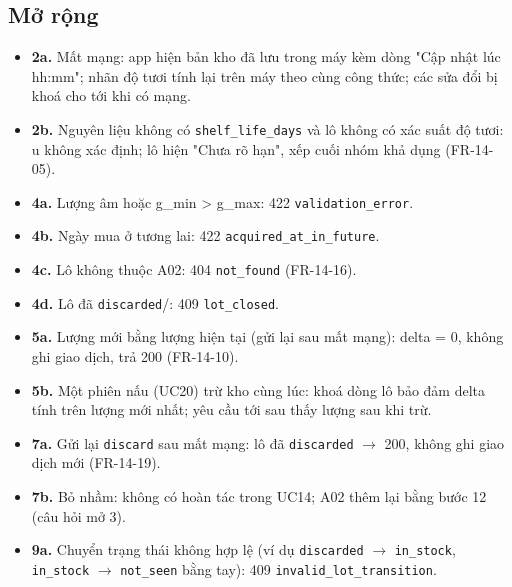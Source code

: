\subsection{Mở rộng}
\begin{itemize}
\item \textbf{2a.} Mất mạng: app hiện bản kho đã lưu trong máy kèm dòng "Cập nhật lúc hh:mm"; nhãn độ tươi tính lại trên máy theo cùng công thức; các sửa đổi bị khoá cho tới khi có mạng.
\item \textbf{2b.} Nguyên liệu không có {\small\texttt{shelf\_\allowbreak{}\allowbreak{}life\_\allowbreak{}\allowbreak{}days}} và lô không có xác suất độ tươi: u không xác định; lô hiện "Chưa rõ hạn", xếp cuối nhóm khả dụng (FR-\allowbreak{}14-\allowbreak{}05).
\item \textbf{4a.} Lượng âm hoặc g\_\allowbreak{}min > g\_\allowbreak{}max: 422 {\small\texttt{validation\_\allowbreak{}\allowbreak{}error}}.
\item \textbf{4b.} Ngày mua ở tương lai: 422 {\small\texttt{acquired\_\allowbreak{}\allowbreak{}at\_\allowbreak{}\allowbreak{}in\_\allowbreak{}\allowbreak{}future}}.
\item \textbf{4c.} Lô không thuộc A02: 404 {\small\texttt{not\_\allowbreak{}\allowbreak{}found}} (FR-\allowbreak{}14-\allowbreak{}16).
\item \textbf{4d.} Lô đã {\small\texttt{discarded}}/: 409 {\small\texttt{lot\_\allowbreak{}\allowbreak{}closed}}.
\item \textbf{5a.} Lượng mới bằng lượng hiện tại (gửi lại sau mất mạng): delta = 0, không ghi giao dịch, trả 200 (FR-\allowbreak{}14-\allowbreak{}10).
\item \textbf{5b.} Một phiên nấu (UC20) trừ kho cùng lúc: khoá dòng lô bảo đảm delta tính trên lượng mới nhất; yêu cầu tới sau thấy lượng sau khi trừ.
\item \textbf{7a.} Gửi lại {\small\texttt{discard}} sau mất mạng: lô đã {\small\texttt{discarded}} \ensuremath{\rightarrow} 200, không ghi giao dịch mới (FR-\allowbreak{}14-\allowbreak{}19).
\item \textbf{7b.} Bỏ nhầm: không có hoàn tác trong UC14; A02 thêm lại bằng bước 12 (câu hỏi mở 3).
\item \textbf{9a.} Chuyển trạng thái không hợp lệ (ví dụ {\small\texttt{discarded}} \ensuremath{\rightarrow} {\small\texttt{in\_\allowbreak{}\allowbreak{}stock}}, {\small\texttt{in\_\allowbreak{}\allowbreak{}stock}} \ensuremath{\rightarrow} {\small\texttt{not\_\allowbreak{}\allowbreak{}seen}} bằng tay): 409 {\small\texttt{invalid\_\allowbreak{}\allowbreak{}lot\_\allowbreak{}\allowbreak{}transition}}.

\end{itemize}
